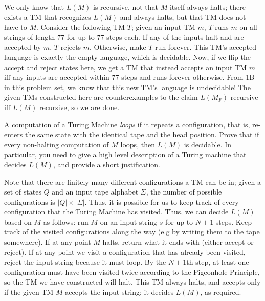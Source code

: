 \documentclass[solution, letterpaper]{cs121}
\begin{document}
\begin{solution}
We only know that $L(M)$ is recursive, not that $M$ itself always halts; there exists a TM that recognizes $L(M)$ and always halts, but that TM does not have to $M$.  Consider the following TM $T$; given an input TM $m$, $T$ runs $m$ on all strings of length 77 for up to 77 steps each.  If any of the inputs halt and are accepted by $m$, $T$ rejects $m$.  Otherwise, make $T$ run forever.  This TM's accepted language is exactly the empty language, which is decidable.  Now, if we flip the accept and reject states here, we get a TM that instead accepts an input TM $m$ iff any inputs are accepted within 77 steps and runs forever otherwise.  From 1B in this problem set, we know that this new TM's language is undecidable!  The given TMs constructed here are counterexamples to the claim $L(M_F)$ recursive iff $L(M)$ recursive, so we are done.
\end{solution}


A computation of a Turing Machine \emph{loops} if it repeats a configuration, that
is, re-enters the same state with the identical tape and the head
position. Prove that if every non-halting computation of $M$ loops, then $L(M)$ is decidable.
In particular, you need to give a high level description of a Turing machine that 
decides $L(M)$, and provide a short justification. 

\begin{solution}
Note that there are finitely many different configurations a TM can be in; given a set of states $Q$ and an input tape alphabet $\Sigma$, the number of possible configurations is $|Q| \times |\Sigma|$.  Thus, it is possible for us to keep track of every configuration that the Turing Machine has visited.  Thus, we can decide $L(M)$ based on $M$ as follows: run $M$ on an input string $s$ for up to $N + 1$ steps.  Keep track of the visited configurations along the way (e.g by writing them to the tape somewhere).  If at any point $M$ halts, return what it ends with (either accept or reject).  If at any point we visit a configuration that has already been visited, reject the input string because it must loop.  By the $N+1$th step, at least one configuration must have been visited twice according to the Pigeonhole Principle, so the TM we have constructed will halt.  This TM always halts, and accepts only if the given TM $M$ accepts the input string; it decides $L(M)$, as required.
\end{solution}
\end{document}
